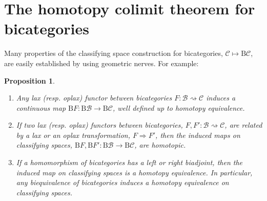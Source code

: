 \documentclass[]{amsart}
\newtheorem{proposition}[theorem]{Proposition}
\begin{document}
\section{The homotopy colimit theorem for bicategories}
Many properties of the classifying space construction for bicategories, ${\ensuremath{\mathcal{C}}}\mapsto {\ensuremath{\mathrm{B}}}{\ensuremath{\mathcal{C}}}$, are
easily established by using geometric nerves. For example:

\begin{proposition}\label{trans}\begin{enumerate}
\item[(i)] Any lax (resp. oplax) functor between bicategories $F:{\ensuremath{\mathcal{B}}}\rightsquigarrow{\ensuremath{\mathcal{C}}}$ induces a continuous map ${\ensuremath{\mathrm{B}}} F:{\ensuremath{\mathrm{B}}}{\ensuremath{\mathcal{B}}}\to{\ensuremath{\mathrm{B}}}{\ensuremath{\mathcal{C}}}$, well defined up to homotopy equivalence.
\item[(ii)] If two lax (resp. oplax) functors between bicategories, $F,F':{\ensuremath{\mathcal{B}}}\rightsquigarrow{\ensuremath{\mathcal{C}}}$, are related by a lax or an oplax
transformation, $F\Rightarrow F'$, then the induced maps on classifying spaces, $ {\ensuremath{\mathrm{B}}} F, {\ensuremath{\mathrm{B}}}
F':{\ensuremath{\mathrm{B}}}{\ensuremath{\mathcal{B}}}\to{\ensuremath{\mathrm{B}}}{\ensuremath{\mathcal{C}}}$, are homotopic.
\item[(iii)] If a homomorphism of bicategories has a left or right biadjoint, then the induced map on classifying spaces is a homotopy
equivalence. In particular, any biequivalence of bicategories induces a homotopy equivalence on
classifying spaces.
\end{enumerate}
\end{proposition}
\end{document}
